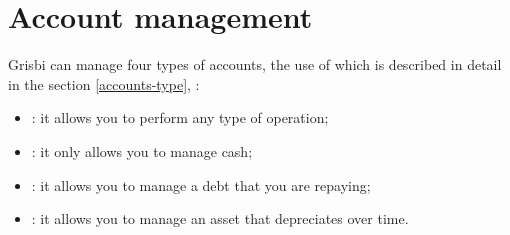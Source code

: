 

\chapter{Account management\label{accounts}}%

Grisbi can manage four types of accounts, the use of which is described in detail in the section \vref{accounts-type}, :
\begin{itemize}
	\item {}: it allows you to perform any type of operation;
	\item {}: it only allows you to manage cash;
	\item {}: it allows you to manage a debt that you are repaying;
	\item {}: it allows you to manage an asset that depreciates over time.
\end{itemize}


